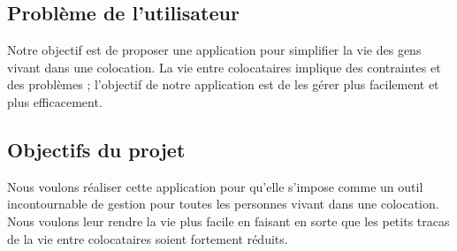 \subsection{Problème de l'utilisateur}
Notre objectif est de proposer une application pour simplifier la vie des gens vivant dans une colocation. La vie entre colocataires implique des contraintes et des problèmes ; l'objectif de notre application est de les gérer plus facilement et plus efficacement.

\subsection{Objectifs du projet}
Nous voulons réaliser cette application pour qu'elle s'impose comme un outil incontournable de gestion pour toutes les personnes vivant dans une colocation. Nous voulons leur rendre la vie plus facile en faisant en sorte que les petits tracas de la vie entre colocataires soient fortement réduits.